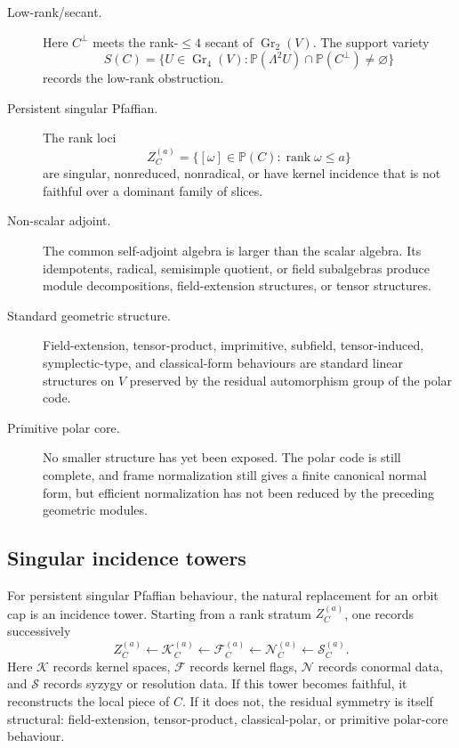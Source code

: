 \documentclass[11pt]{article}
\begin{document}
\begin{description}
\item[Low-rank/secant.]
Here $C^\perp$ meets the rank-$\le4$ secant of $\operatorname{Gr}_2(V)$. The support variety
\[
S(C)=
\{U\in\operatorname{Gr}_4(V):\mathbb P(\Lambda^2U)\cap\mathbb P(C^\perp)\ne\varnothing\}
\]
records the low-rank obstruction.

\item[Persistent singular Pfaffian.]
The rank loci
\[
Z_C^{(a)}=\{[\omega]\in\mathbb P(C):\operatorname{rank}\omega\le a\}
\]
are singular, nonreduced, nonradical, or have kernel incidence that is not faithful over a dominant family of slices.

\item[Non-scalar adjoint.]
The common self-adjoint algebra is larger than the scalar algebra. Its idempotents, radical, semisimple quotient, or field subalgebras produce module decompositions, field-extension structures, or tensor structures.

\item[Standard geometric structure.]
Field-extension, tensor-product, imprimitive, subfield, tensor-induced, symplectic-type, and classical-form behaviours are standard linear structures on $V$ preserved by the residual automorphism group of the polar code.

\item[Primitive polar core.]
No smaller structure has yet been exposed. The polar code is still complete, and frame normalization still gives a finite canonical normal form, but efficient normalization has not been reduced by the preceding geometric modules.
\end{description}

\subsection{Singular incidence towers}

For persistent singular Pfaffian behaviour, the natural replacement for an orbit cap is an incidence tower. Starting from a rank stratum $Z_C^{(a)}$, one records successively
\[
Z_C^{(a)}
\leftarrow
\mathcal K_C^{(a)}
\leftarrow
\mathcal F_C^{(a)}
\leftarrow
\mathcal N_C^{(a)}
\leftarrow
\mathcal S_C^{(a)}.
\]
Here $\mathcal K$ records kernel spaces, $\mathcal F$ records kernel flags, $\mathcal N$ records conormal data, and $\mathcal S$ records syzygy or resolution data. If this tower becomes faithful, it reconstructs the local piece of $C$. If it does not, the residual symmetry is itself structural: field-extension, tensor-product, classical-polar, or primitive polar-core behaviour.
\end{document}
